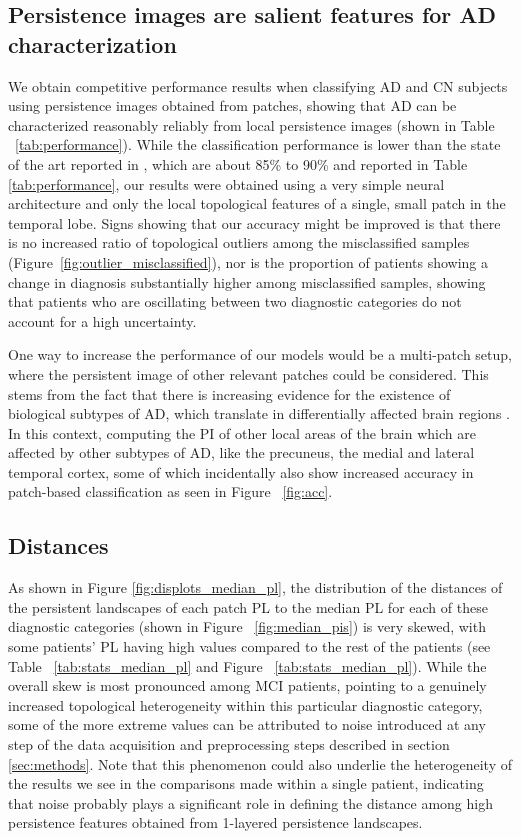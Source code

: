\documentclass{article}
\begin{document}
\subsection{Persistence images are salient features for AD characterization}

We obtain competitive performance results when classifying AD and CN subjects using persistence images obtained from patches, showing that AD can be characterized reasonably reliably from local persistence images (shown in Table ~\ref{tab:performance}). While the classification performance is lower than the state of the art reported in \citep{liu2018anatomical}, which are about 85\% to 90\% and reported in Table \ref{tab:performance}, our results were obtained using a very simple neural architecture and only the local topological features of a single, small patch in the temporal lobe. Signs showing that our accuracy might be improved is that there is no increased ratio of topological outliers among the misclassified samples (Figure~\ref{fig:outlier_misclassified}), nor is the proportion of patients showing a change in diagnosis substantially higher among misclassified samples, showing that patients who are oscillating between two diagnostic categories do not account for a high uncertainty.

One way to increase the performance of our models would be a multi-patch setup, where the persistent image of other relevant patches could be considered. This stems from the fact that there is increasing evidence for the existence of biological subtypes of AD, which translate in differentially affected brain regions \citep{tijms2020pathophysiological,poulakis2018heterogeneous}. In this context, computing the PI of other local areas of the brain which are affected by other subtypes of AD, like the precuneus, the medial and lateral temporal cortex, some of which incidentally also show increased accuracy in patch-based classification as seen in Figure ~\ref{fig:acc}.

\subsection{Distances}\label{sec:disc-dist}

As shown in Figure \ref{fig:displots_median_pl}, the distribution of the distances of the persistent landscapes of each patch PL to the median PL for each of these diagnostic categories (shown in Figure ~\ref{fig:median_pis}) is very skewed, with some patients' PL having high values compared to the rest of the patients (see Table ~\ref{tab:stats_median_pl} and Figure ~\ref{tab:stats_median_pl}). While the overall skew is most pronounced among MCI patients, pointing to a genuinely increased topological heterogeneity within this particular diagnostic category, some of the more extreme values can be attributed to noise introduced at any step of the data acquisition and preprocessing steps described in section \ref{sec:methods}. Note that this phenomenon could also underlie the heterogeneity of the results we see in the comparisons made within a single patient, indicating that noise probably plays a significant role in defining the distance among high persistence features obtained from 1-layered persistence landscapes.
\end{document}
